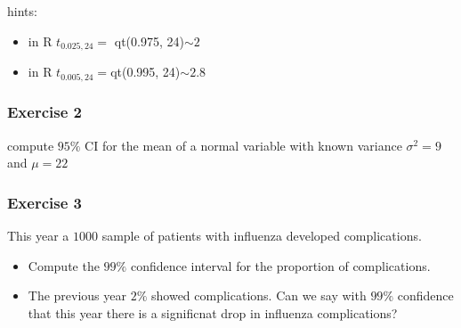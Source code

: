 \documentclass[
]{book}
\begin{document}
hints:

\begin{itemize}
\item
  in R \(t_{0.025, 24}=\) qt(0.975, 24)\(\sim 2\)
\item
  in R \(t_{0.005, 24}=\)qt(0.995, 24)\(\sim 2.8\)
\end{itemize}

\hypertarget{exercise-2-9}{%
\subsubsection{Exercise 2}\label{exercise-2-9}}

compute \(95\%\) CI for the mean of a normal variable with known variance \(\sigma^2=9\) and \(\mu=22\)

\hypertarget{exercise-3-6}{%
\subsubsection{Exercise 3}\label{exercise-3-6}}

This year a \(1000\) sample of patients with influenza developed complications.

\begin{itemize}
\item
  Compute the \(99\%\) confidence interval for the proportion of complications.
\item
  The previous year \(2\%\) showed complications. Can we say with \(99\%\) confidence that this year there is a significnat drop in influenza complications?
\end{itemize}

  
\end{document}
